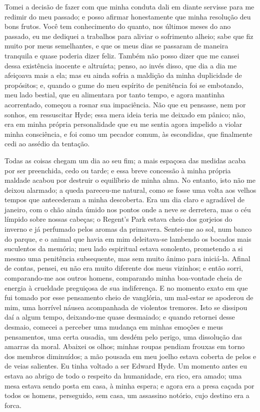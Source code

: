 Tomei a decisão de fazer com que minha conduta dali em diante servisse
para me redimir do meu passado; e posso afirmar honestamente que minha
resolução deu bons frutos.  Você tem conhecimento do quanto, nos
últimos meses do ano passado, eu me dediquei a trabalhos para aliviar o
sofrimento alheio; sabe que fiz muito por meus semelhantes, e que os
meus dias se passaram de maneira tranquila e quase poderia dizer feliz.
Também não posso dizer que me cansei dessa existência inocente e
altruísta; penso, ao invés disso, que dia a dia me afeiçoava mais a
ela; mas eu ainda sofria a maldição da minha duplicidade de propósitos;
e, quando o gume do meu espírito de penitência foi se embotando, meu
lado bestial, que eu alimentara por tanto tempo, e agora mantinha
acorrentado, começou a rosnar sua impaciência.  Não que eu pensasse,
nem por sonhos, em ressuscitar Hyde; essa mera ideia teria me
deixado em pânico; não, era em minha própria personalidade que eu me
sentia agora impelido a violar minha consciência, e foi como um pecador
comum, às escondidas, que finalmente cedi ao assédio da tentação. 

Todas as coisas chegam um dia ao seu fim; a mais espaçosa das medidas
acaba por ser preenchida, cedo ou tarde; e essa breve concessão à minha
própria maldade acabou por destruir o equilíbrio de minha alma.  No
entanto, isto não me deixou alarmado; a queda pareceu-me natural, como
se fosse uma volta aos velhos tempos que antecederam a minha
descoberta.  Era um dia claro e agradável de janeiro, com o chão ainda
úmido nos pontos onde a neve se derretera, mas o céu límpido sobre
nossas cabeças; o Regent’s Park estava cheio dos gorjeios do inverno e
já perfumado pelos aromas da primavera.  Sentei-me ao sol, num banco do
parque, e o animal que havia em mim deleitava-se lambendo os bocados
mais suculentos da memória; meu lado espiritual estava sonolento,
prometendo a si mesmo uma penitência subsequente, mas sem muito ânimo
para iniciá-la.  Afinal de contas, pensei, eu não era muito diferente
dos meus vizinhos; e então sorri, comparando-me aos outros homens,
comparando minha boa-vontade cheia de energia à crueldade preguiçosa de
sua indiferença.  E no momento exato em que fui tomado por esse
pensamento cheio de vanglória, um mal-estar se apoderou de mim, uma
horrível náusea acompanhada de violentos tremores.  Isto se dissipou
daí a algum tempo, deixando-me quase desmaiado; e quando retornei
desse desmaio, comecei a perceber uma mudança em minhas emoções e meus
pensamentos, uma certa ousadia, um desdém pelo perigo, uma dissolução
das amarras da moral.  Abaixei os olhos; minhas roupas pendiam frouxas
em torno dos membros diminuídos; a mão pousada em meu joelho estava
coberta de pelos e de veias salientes.  Eu tinha voltado a ser Edward
Hyde.  Um momento antes eu estava ao abrigo de todo o respeito da
humanidade, era rico, era amado; uma mesa estava sendo posta em casa, à
minha espera; e agora era a presa caçada por todos os homens,
perseguido, sem casa, um assassino notório, cujo destino era a forca.

